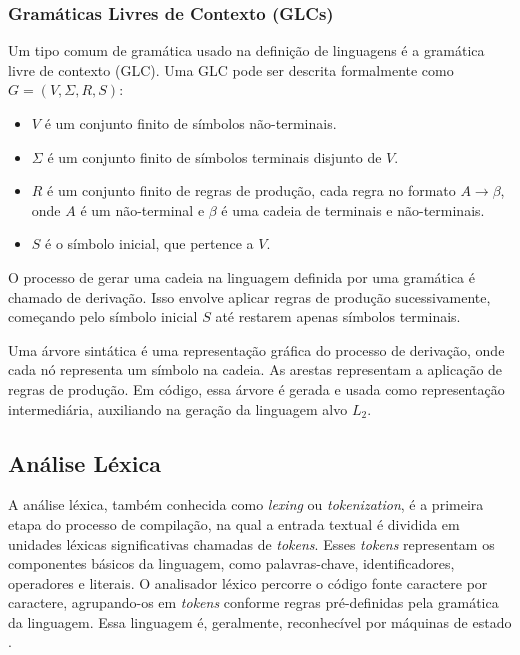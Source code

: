 \documentclass[english, 
               brazil, 
               bsc] %
               {dcomp-abntex2}
\begin{document}
\subsubsection{Gramáticas Livres de Contexto (GLCs)}


Um tipo comum de gramática usado na definição de linguagens é a gramática livre de contexto (GLC).  Uma GLC pode ser descrita formalmente como $ G=(V,\Sigma,R,S)$:


\begin{itemize}
  \item $V$ é um conjunto finito de símbolos não-terminais.


  \item $\Sigma$ é um conjunto finito de símbolos terminais disjunto de $V$.


  \item $R$ é um conjunto finito de regras de produção, cada regra no formato $A \rightarrow \beta$, onde $A$ é um não-terminal e $\beta$ é uma cadeia de terminais e não-terminais.


  \item $S$ é o símbolo inicial, que pertence a $V$.
\end{itemize}


O processo de gerar uma cadeia na linguagem definida por uma gramática é chamado de derivação. Isso envolve aplicar regras de produção sucessivamente, começando pelo símbolo inicial $S$ até restarem apenas símbolos terminais.


Uma árvore sintática é uma representação gráfica do processo de derivação, onde cada nó representa um símbolo na cadeia. As arestas representam a aplicação de regras de produção. Em código, essa árvore é gerada e usada como representação intermediária,  auxiliando na geração da linguagem alvo $L_2$.




\subsection{Análise Léxica}
A análise léxica, também conhecida como \textit{lexing} ou \textit{tokenization}, é a primeira etapa do processo de compilação, na qual a entrada textual é dividida em unidades léxicas significativas chamadas de \textit{tokens}. Esses \textit{tokens} representam os componentes básicos da linguagem, como palavras-chave, identificadores, operadores e literais. O analisador léxico percorre o código fonte caractere por caractere, agrupando-os em \textit{tokens} conforme regras pré-definidas pela gramática da linguagem. Essa linguagem é, geralmente, reconhecível por máquinas de estado \cite{automata}.
\end{document}
